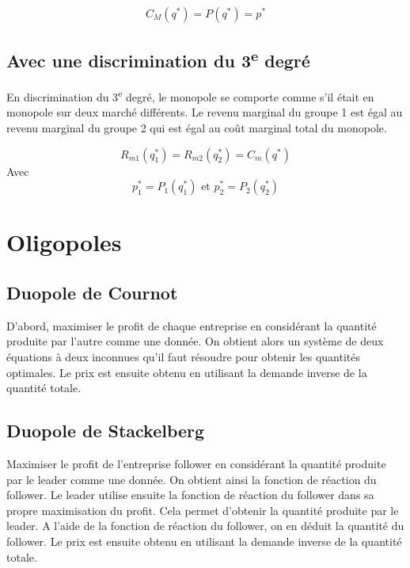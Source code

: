 \documentclass[
]{book}
\theoremstyle{definition}
\theoremstyle{definition}
\theoremstyle{definition}
\theoremstyle{definition}
\theoremstyle{remark}
\begin{document}
\[C_M(q^*)=P(q^*)=p^*\]

\hypertarget{avec-une-discrimination-du-3e-degruxe9}{%
\subsection{\texorpdfstring{Avec une discrimination du 3\textsuperscript{e} degré}{Avec une discrimination du 3e degré}}\label{avec-une-discrimination-du-3e-degruxe9}}

En discrimination du 3\textsuperscript{e} degré, le monopole se comporte comme s'il était en monopole sur deux marché différents.
Le revenu marginal du groupe 1 est égal au revenu marginal du groupe 2 qui est égal au coût marginal total du monopole.

\[R_{m1}(q_1^*)=R_{m2}(q_2^*)=C_m(q^*)\]
Avec
\[p_1^*=P_1(q_1^*)\text{ et }p_2^*=P_2(q_2^*)\]

\hypertarget{oligopoles-2}{%
\section{Oligopoles}\label{oligopoles-2}}

\hypertarget{duopole-de-cournot}{%
\subsection{Duopole de Cournot}\label{duopole-de-cournot}}

D'abord, maximiser le profit de chaque entreprise en considérant la quantité produite par l'autre comme une donnée.
On obtient alors un système de deux équations à deux inconnues qu'il faut résoudre pour obtenir les quantités optimales.
Le prix est ensuite obtenu en utilisant la demande inverse de la quantité totale.

\hypertarget{duopole-de-stackelberg}{%
\subsection{Duopole de Stackelberg}\label{duopole-de-stackelberg}}

Maximiser le profit de l'entreprise follower en considérant la quantité produite par le leader comme une donnée.
On obtient ainsi la fonction de réaction du follower.
Le leader utilise ensuite la fonction de réaction du follower dans sa propre maximisation du profit.
Cela permet d'obtenir la quantité produite par le leader.
A l'aide de la fonction de réaction du follower, on en déduit la quantité du follower.
Le prix est ensuite obtenu en utilisant la demande inverse de la quantité totale.
\end{document}
